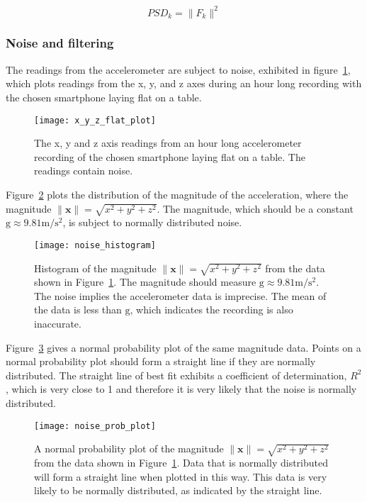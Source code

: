       $$PSD_k = \|F_k\|^2$$
      
    \subsubsection{Noise and filtering}
      The readings from the accelerometer are subject to noise, exhibited in 
      figure~\ref{fig:x_y_z_flat_plot}, which plots readings from the x, y, and z axes during an hour long recording with the chosen smartphone laying flat on a table.
      
      \begin{figure}
        \centering
        \texttt{[image: x\_y\_z\_flat\_plot]}
        \caption{The x, y and z axis readings from an hour long accelerometer recording of the chosen smartphone laying flat on a table. The readings contain noise.}
        \label{fig:x_y_z_flat_plot}
      \end{figure}
      
      
      Figure~\ref{fig:noise_histogram} plots the distribution of the magnitude of the acceleration, where the magnitude $\|\mathbf{x}\| = \sqrt{x^2+y^2+z^2}$. The magnitude, which should be a constant $\mathrm{g} \approx 9.81 \si{\meter\per\square\second}$, is subject to normally distributed noise.
      
      \begin{figure}
        \centering
        \texttt{[image: noise\_histogram]}
        \caption{Histogram of the magnitude $\|\mathbf{x}\| = \sqrt{x^2+y^2+z^2}$ from the data shown in Figure~\ref{fig:x_y_z_flat_plot}. The magnitude should measure $ \mathrm{g} \approx 9.81\si{\metre\per\square\second}$. The noise implies the accelerometer data is imprecise. The mean of the data is less than $\mathrm{g}$, which indicates the recording is also inaccurate.}
        \label{fig:noise_histogram}
      \end{figure}
      
      Figure~\ref{fig:noise_prob_plot} gives a normal probability plot of the same magnitude data. Points on a normal probability plot should form a straight line if they are normally distributed. The straight line of best fit exhibits a coefficient of determination, $R^2$, which is very close to 1 and therefore it is very likely that the noise is normally distributed.
      
      \begin{figure}
        \centering
        \texttt{[image: noise\_prob\_plot]}
        \caption{A normal probability plot of the magnitude $\|\mathbf{x}\| = \sqrt{x^2+y^2+z^2}$  from the data shown in Figure~\ref{fig:x_y_z_flat_plot}. Data that is normally distributed will form a straight line when plotted in this way. This data is very likely to be normally distributed, as indicated by the straight line.}
        \label{fig:noise_prob_plot}
      \end{figure}
      
